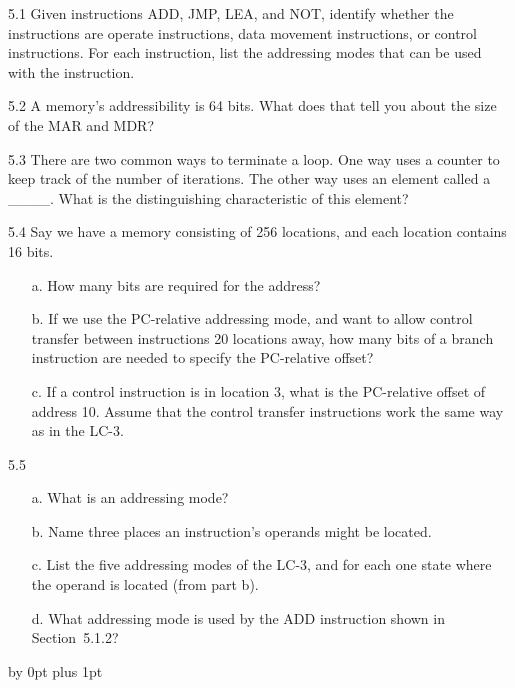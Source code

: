 \documentclass{patt}
\begin{document}
\vspace{-12pt}
\begin{exercises}

\item[5.1] Given instructions ADD, JMP, LEA, and NOT, identify whether
  the instructions are operate instructions, data movement
  instructions, or control instructions.  For each instruction, list
  the addressing modes that can be used with the instruction.

\item[5.2] A memory's addressibility is 64 bits. What does that tell
  you about the size of the MAR and MDR?

\item[5.3] There are two common ways to terminate a loop. One way uses
  a counter to keep track of the number of iterations. The other way
  uses an element called a \_\_\_\_. What is the distinguishing
  characteristic of this element?

\item[5.4] Say we have a memory consisting of 256 locations, and each
  location contains 16 bits.
\begin{enumerate}
\item[a.] How many bits are required for the address?
\item[b.] If we use the PC-relative addressing mode, and want to allow
  control transfer between instructions 20 locations away, how many
  bits of a branch instruction are needed to specify the PC-relative
  offset?
\item[c.] If a control instruction is in location 3, what is the
  PC-relative offset of address 10. Assume that the control transfer
  instructions work the same way as in the LC-3.
\end{enumerate}
\item[5.5]
\begin{enumerate}[a.]
\item[a.] What is an addressing mode?
\item[b.] Name three places an instruction's operands might be located.
\item[c.] List the five addressing modes of the LC-3, and for each one
  state where the operand is located (from part b).
\item[d.] What addressing mode is used by the ADD instruction shown in  Section~5.1.2?
\end{enumerate}

\pagebreak

\bgroup
\advance\itemsep by 0pt plus 1pt


\end{exercises}
\end{document}
